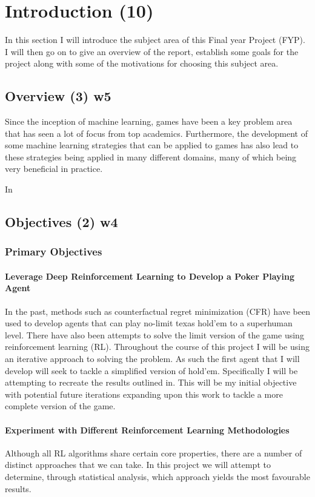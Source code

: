 \chapter{Introduction (10)}
\label{ch:intro}
In this section I will introduce the subject area of this Final year Project (FYP).
I will then go on to give an overview of the report, establish some goals for the project along with some of
the motivations for choosing this subject area.


\section{Overview (3) w5}\label{sec:overview}
Since the inception of machine learning, games have been a key problem area that has seen a lot of focus from
top academics.
Furthermore, the development of some machine learning strategies that can be applied to games has also lead to these
strategies being applied in many different domains, many of which being very beneficial in practice.

In


\section{Objectives (2) w4}\label{sec:objectives}
\subsection{Primary Objectives}\label{subsec:primaryObjectives}
\subsubsection{Leverage Deep Reinforcement Learning to Develop a Poker Playing Agent}
In the past, methods such as counterfactual regret minimization (CFR) have been used to develop agents that can
play no-limit texas hold'em to a superhuman level.
There have also been attempts to solve the limit version of the game using reinforcement learning (RL).
Throughout the course of this project I will be using an iterative approach to solving the problem.
As such the first agent that I will develop will seek to tackle a simplified version of hold'em.
Specifically I will be attempting to recreate the results outlined in\cite{dahl2001reinforcement}.
This will be my initial objective with potential future iterations expanding upon this work to tackle a more complete
version of the game.

\subsubsection{Experiment with Different Reinforcement Learning Methodologies}
Although all RL algorithms share certain core properties, there are a number of distinct approaches that we can take.
In this project we will attempt to determine, through statistical analysis, which approach yields the most favourable results.

